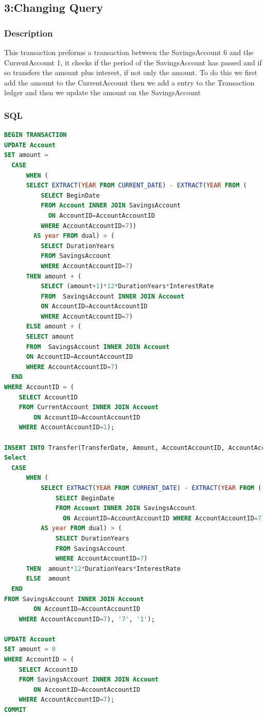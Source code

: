 \documentclass[a4paper, 10pt]{article}
\begin{document}
\subsection{3:Changing Query}
\subsubsection{Description}
This transaction preforms a transaction between the SavingsAccount 6 and the CurrentAccount 1, it checks if the period of the SavingsAccount has passed and if so transfers the amount plus interest, if not only the amount. To do this we first add the amount to the CurrentAccount then we add a entry to the Transaction ledger and then we update the amount on the SavingsAccount

\subsubsection{SQL}
\begin{lstlisting}[language=SQL]
BEGIN TRANSACTION
UPDATE Account 
SET amount =     
  CASE          
      WHEN (
      SELECT EXTRACT(YEAR FROM CURRENT_DATE) - EXTRACT(YEAR FROM (
          SELECT BeginDate 
          FROM Account INNER JOIN SavingsAccount 
            ON AccountID=AccountAccountID 
          WHERE AccountAccountID=7))
        AS year FROM dual) > (
          SELECT DurationYears 
          FROM SavingsAccount 
          WHERE AccountAccountID=7)
      THEN amount + ( 
          SELECT (amount+1)*12*DurationYears*InterestRate 
          FROM  SavingsAccount INNER JOIN Account 
          ON AccountID=AccountAccountID 
          WHERE AccountAccountID=7)   
      ELSE amount + ( 
      SELECT amount 
      FROM  SavingsAccount INNER JOIN Account 
      ON AccountID=AccountAccountID 
      WHERE AccountAccountID=7) 
  END 
WHERE AccountID = (
    SELECT AccountID 
    FROM CurrentAccount INNER JOIN Account 
        ON AccountID=AccountAccountID 
    WHERE AccountAccountID=1);

INSERT INTO Transfer(TransferDate, Amount, AccountAccountID, AccountAccountID2) VALUES (CURRENT_DATE, (
Select
  CASE
      WHEN (
          SELECT EXTRACT(YEAR FROM CURRENT_DATE) - EXTRACT(YEAR FROM (
              SELECT BeginDate 
              FROM Account INNER JOIN SavingsAccount 
                ON AccountID=AccountAccountID WHERE AccountAccountID=7)) 
          AS year FROM dual) > (
              SELECT DurationYears 
              FROM SavingsAccount 
              WHERE AccountAccountID=7)
      THEN  amount*12*DurationYears*InterestRate
      ELSE  amount
  END
FROM SavingsAccount INNER JOIN Account
        ON AccountID=AccountAccountID
    WHERE AccountAccountID=7), '7', '1');

UPDATE Account
SET amount = 0
WHERE AccountID = (
    SELECT AccountID 
    FROM SavingsAccount INNER JOIN Account 
        ON AccountID=AccountAccountID 
    WHERE AccountAccountID=7);
COMMIT
\end{lstlisting}
\end{document}

